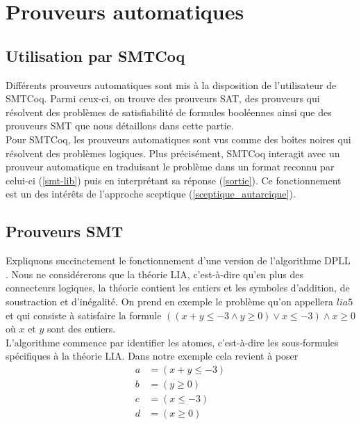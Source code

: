 \documentclass[11pt]{article}
\begin{document}
\newpage
\section{Prouveurs automatiques} \label{fonctionnement_prouveurs}

\subsection{Utilisation par SMTCoq}

Différents prouveurs automatiques sont mis à la disposition de l'utilisateur de SMTCoq. Parmi ceux-ci, on trouve des prouveurs SAT, des prouveurs qui résolvent des problèmes de satisfiabilité de formules booléennes ainsi que des prouveurs SMT que nous détaillons dans cette partie. \\ 

Pour SMTCoq, les prouveurs automatiques sont vus comme des boîtes noires qui résolvent des problèmes logiques. Plus précisément, SMTCoq interagit avec un prouveur automatique en traduisant le problème dans un format reconnu par celui-ci (\ref{smt-lib}) puis en interprétant sa réponse (\ref{sortie}). Ce fonctionnement est un des intérêts de l'approche sceptique (\ref{sceptique_autarcique}).

\subsection{Prouveurs SMT} \label{smt}

Expliquons succinctement le fonctionnement d'une version de l'algorithme DPLL \cite{dpll}. Nous ne considérerons que la théorie LIA, c'est-à-dire qu'en plus des connecteurs logiques, la théorie contient les entiers et les symboles d'addition, de soustraction et d'inégalité. On prend en exemple le problème qu'on appellera $lia5$ et qui consiste à satisfaire la formule $((x + y \leq -3 \wedge y \geq 0) \vee x \leq -3) \wedge x \geq 0$ où $x$ et $y$ sont des entiers. \\

L'algorithme commence par identifier les atomes, c'est-à-dire les sous-formules spécifiques à la théorie LIA. Dans notre exemple cela revient à poser 
\begin{align*}
a &= (x + y \leq -3) \\
b &= (y \geq 0) \\
c &= (x \leq -3) \\
d &= (x \geq 0)
\end{align*}
\end{document}
